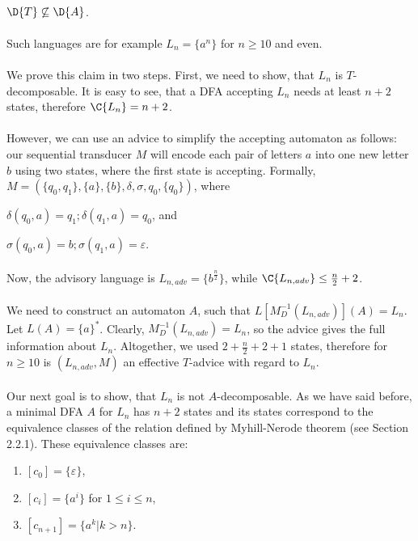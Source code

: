 \paragraph{}
\cveta $\D{T} \not \subseteq \D{A}$.

\paragraph{}
\dokaz Such languages are for example $L_{n} = \{ a^n \}$ for $n \geq 10$ and even.

\paragraph{}
We prove this claim in two steps. First, we need to show, that $L_{n}$ is $T$-decomposable. It is easy to see, that a DFA accepting $L_{n}$ needs at least $n+2$ states, therefore $\C{L_n} = n + 2$.

\paragraph{}
However, we can use an advice to simplify the accepting automaton as follows: our sequential transducer $M$ will encode each pair of letters $a$ into one new letter $b$ using two states, where the first state is accepting. Formally, $M = (\{q_0,q_1\},\{a\},\{b\},\delta,\sigma,q_0,\{q_0\})$, where\\
\centerline{$\delta(q_0,a) = q_1; \delta(q_1,a)=q_0$, and}
\centerline{$\sigma(q_0,a) = b; \sigma(q_1,a) = \varepsilon$.}

\paragraph{}
Now, the advisory language is $L_{n,adv} = \{ b^{\frac{n}{2}} \}$, while $\C{L_{n,adv}} \leq \frac{n}{2} + 2$.

\paragraph{}
We need to construct an automaton $A$, such that $L[M^{-1}_{D}(L_{n,adv})](A) = L_n$. Let $L(A) = \{a\}^*$. Clearly, $M^{-1}_{D}(L_{n,adv}) = L_n$, so the advice gives the full information about $L_n$. Altogether, we used $2 + \frac{n}{2}+2+1$ states, therefore for $n \geq 10$ is $(L_{n,adv}, M)$ an effective $T$-advice with regard to $L_n$.

\paragraph{}
Our next goal is to show, that $L_n$ is not $A$-decomposable. As we have said before, a minimal DFA $A$ for $L_n$ has $n+2$ states and its states correspond to the equivalence classes of the relation defined by Myhill-Nerode theorem (see Section 2.2.1). These equivalence classes are:
\begin{enumerate}
\item $[c_0] = \{ \varepsilon \}$,
\item $[c_{i}] = \{ a^i \}$ for $1 \leq i \leq n$,
\item $[c_{n+1}] = \{ a^k | k > n \}$.
\end{enumerate}

